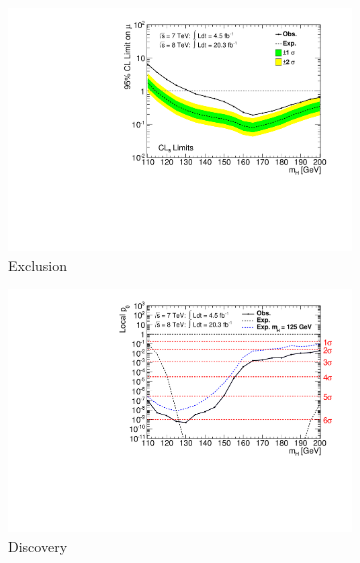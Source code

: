 \begin{figure}[p]
	\begin{subfigure}[b]{0.495\textwidth}
		\centering
		\includegraphics[width=\textwidth,clip=true,trim=0.6cm 0.8cm 0.6cm 0.4cm]{custom_images/limits/cls_combined}
		\caption{Exclusion}
		\label{fig:comb_results:CLs}
	\end{subfigure}
	\hfill
	\begin{subfigure}[b]{0.495\textwidth}
		\centering
		\includegraphics[width=\textwidth,clip=true,trim=0.6cm 0.8cm 0.6cm 0.4cm]{custom_images/limits/p0_combined}
		\caption{Discovery}
		\label{fig:comb_results:p0}
	\end{subfigure}
	\\[12pt]
	\begin{subfigure}[b]{0.495\textwidth}
		\centering

\end{subfigure}
\end{figure}
